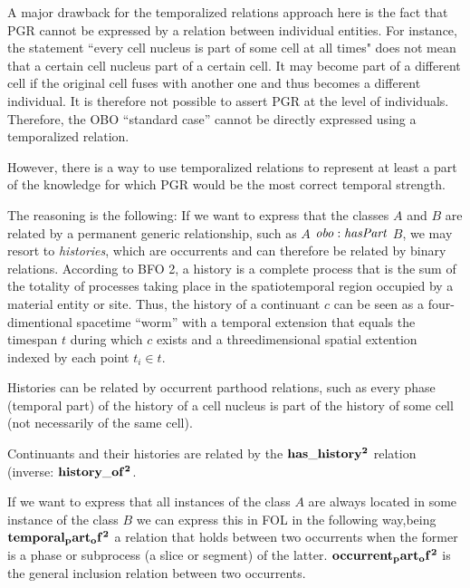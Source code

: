 A major drawback for the temporalized relations approach here is the fact that PGR cannot be expressed by a relation between individual entities. For instance, the statement ``every cell nucleus is part of some cell at all times" does not mean that a certain cell nucleus part of a certain cell. It may become part of a different cell if the original cell fuses with another one and thus becomes a different individual. It is therefore not possible to assert PGR at the level of individuals. Therefore, the OBO ``standard case'' cannot be directly expressed using a temporalized relation.

However, there is a way to use temporalized relations to represent at least a part of the knowledge for which PGR would be the most correct temporal strength.

The reasoning is the following: If we want to express that the classes $A$ and $B$ are related by a permanent generic relationship, such as $A$ $\mathit{obo:hasPart}$ $B$, we may resort to \emph{histories}, which are occurrents and can therefore be related by binary relations. According to BFO 2, a history is a complete process that is the sum of the totality of processes taking place in the spatiotemporal region occupied by a material entity or site. Thus, the history of a continuant $c$ can be seen as a four-dimentional spacetime ``worm'' with a temporal extension that equals the timespan $t$ during which $c$ exists and a threedimensional spatial extention indexed by each point $t_i \in t$. 

Histories can be related by occurrent parthood relations, such as every phase (temporal part) of the history of a cell nucleus is part of the history of some cell (not necessarily of the same cell).  

Continuants and their histories are related by the $\mathrm{\mathbf{has\_history^2}}$ relation (inverse: $\mathrm{\mathbf{history\_of^2}}$.

If we want to express that all instances of the class $A$ are always located in some instance of the class $B$ we can express this in FOL in the following way,being $\mathrm{\mathbf{temporal_part_of^2}}$ a relation that holds between two occurrents when the former is a phase or subprocess (a slice or segment) of the latter. $\mathrm{\mathbf{occurrent_part_of^2}}$ is the general inclusion relation between two occurrents. 


